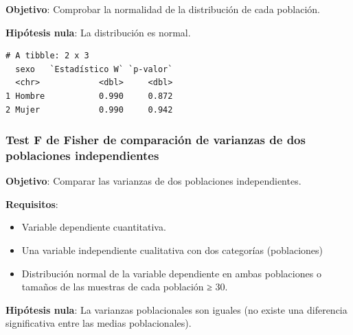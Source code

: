 \documentclass[
  a4paper,
]{scrreport}
\newenvironment{Shaded}{\begin{snugshade}}{\end{snugshade}}
\newcommand{\AttributeTok}[1]{\textcolor[rgb]{0.40,0.45,0.13}{#1}}
\newcommand{\FunctionTok}[1]{\textcolor[rgb]{0.28,0.35,0.67}{#1}}
\newcommand{\NormalTok}[1]{\textcolor[rgb]{0.00,0.23,0.31}{#1}}
\newcommand{\OtherTok}[1]{\textcolor[rgb]{0.00,0.23,0.31}{#1}}
\newcommand{\SpecialCharTok}[1]{\textcolor[rgb]{0.37,0.37,0.37}{#1}}
\newcommand{\StringTok}[1]{\textcolor[rgb]{0.13,0.47,0.30}{#1}}
\providecommand{\tightlist}{%
  \setlength{\itemsep}{0pt}\setlength{\parskip}{0pt}}\usepackage{longtable,booktabs,array}
\theoremstyle{definition}
\theoremstyle{definition}
\theoremstyle{remark}
\begin{document}
\textbf{Objetivo}: Comprobar la normalidad de la distribución de cada
población.

\textbf{Hipótesis nula}: La distribución es normal.

\begin{Shaded}
\end{Shaded}

\begin{verbatim}
# A tibble: 2 x 3
  sexo   `Estadístico W` `p-valor`
  <chr>            <dbl>     <dbl>
1 Hombre           0.990     0.872
2 Mujer            0.990     0.942
\end{verbatim}

\hypertarget{test-f-de-fisher-de-comparaciuxf3n-de-varianzas-de-dos-poblaciones-independientes}{%
\subsubsection{Test F de Fisher de comparación de varianzas de dos
poblaciones
independientes}\label{test-f-de-fisher-de-comparaciuxf3n-de-varianzas-de-dos-poblaciones-independientes}}

\textbf{Objetivo}: Comparar las varianzas de dos poblaciones
independientes.

\textbf{Requisitos}:

\begin{itemize}
\tightlist
\item
  Variable dependiente cuantitativa.
\item
  Una variable independiente cualitativa con dos categorías
  (poblaciones)
\item
  Distribución normal de la variable dependiente en ambas poblaciones o
  tamaños de las muestras de cada población ≥ 30.
\end{itemize}

\textbf{Hipótesis nula}: La varianzas poblacionales son iguales (no
existe una diferencia significativa entre las medias poblacionales).
\end{document}
